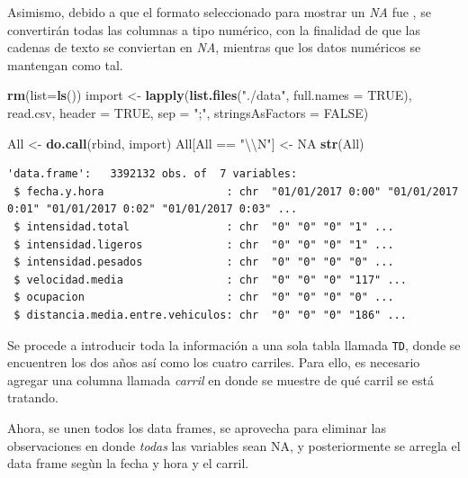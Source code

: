 \documentclass[]{article}
\newenvironment{Shaded}{\begin{snugshade}}{\end{snugshade}}
\newcommand{\KeywordTok}[1]{\textcolor[rgb]{0.13,0.29,0.53}{\textbf{{#1}}}}
\newcommand{\DataTypeTok}[1]{\textcolor[rgb]{0.13,0.29,0.53}{{#1}}}
\newcommand{\CharTok}[1]{\textcolor[rgb]{0.31,0.60,0.02}{{#1}}}
\newcommand{\StringTok}[1]{\textcolor[rgb]{0.31,0.60,0.02}{{#1}}}
\newcommand{\OtherTok}[1]{\textcolor[rgb]{0.56,0.35,0.01}{{#1}}}
\newcommand{\NormalTok}[1]{{#1}}
\begin{document}
Asimismo, debido a que el formato seleccionado para mostrar un \emph{NA}
fue \emph{\N}, se convertirán todas las columnas a tipo numérico, con la
finalidad de que las cadenas de texto se conviertan en \emph{NA},
mientras que los datos numéricos se mantengan como tal.

\begin{Shaded}
\begin{Highlighting}[]
\KeywordTok{rm}\NormalTok{(}\DataTypeTok{list=}\KeywordTok{ls}\NormalTok{())}
\NormalTok{import <-}\StringTok{ }\KeywordTok{lapply}\NormalTok{(}\KeywordTok{list.files}\NormalTok{(}\StringTok{"./data"}\NormalTok{, }\DataTypeTok{full.names =} \OtherTok{TRUE}\NormalTok{),}
                 \NormalTok{read.csv, }\DataTypeTok{header =} \OtherTok{TRUE}\NormalTok{, }\DataTypeTok{sep =} \StringTok{";"}\NormalTok{, }\DataTypeTok{stringsAsFactors =} \OtherTok{FALSE}\NormalTok{)}

\NormalTok{All <-}\StringTok{ }\KeywordTok{do.call}\NormalTok{(rbind, import)}
\NormalTok{All[All ==}\StringTok{ "}\CharTok{\textbackslash{}\textbackslash{}}\StringTok{N"}\NormalTok{] <-}\StringTok{ }\OtherTok{NA}
\KeywordTok{str}\NormalTok{(All)}
\end{Highlighting}
\end{Shaded}

\begin{verbatim}
'data.frame':   3392132 obs. of  7 variables:
 $ fecha.y.hora                   : chr  "01/01/2017 0:00" "01/01/2017 0:01" "01/01/2017 0:02" "01/01/2017 0:03" ...
 $ intensidad.total               : chr  "0" "0" "0" "1" ...
 $ intensidad.ligeros             : chr  "0" "0" "0" "1" ...
 $ intensidad.pesados             : chr  "0" "0" "0" "0" ...
 $ velocidad.media                : chr  "0" "0" "0" "117" ...
 $ ocupacion                      : chr  "0" "0" "0" "0" ...
 $ distancia.media.entre.vehiculos: chr  "0" "0" "0" "186" ...
\end{verbatim}

Se procede a introducir toda la información a una sola tabla llamada
\texttt{TD}, donde se encuentren los dos años así como los cuatro
carriles. Para ello, es necesario agregar una columna llamada
\emph{carril} en donde se muestre de qué carril se está tratando.

Ahora, se unen todos los data frames, se aprovecha para eliminar las
observaciones en donde \emph{todas} las variables sean NA, y
posteriormente se arregla el data frame segùn la fecha y hora y el
carril.
\end{document}
